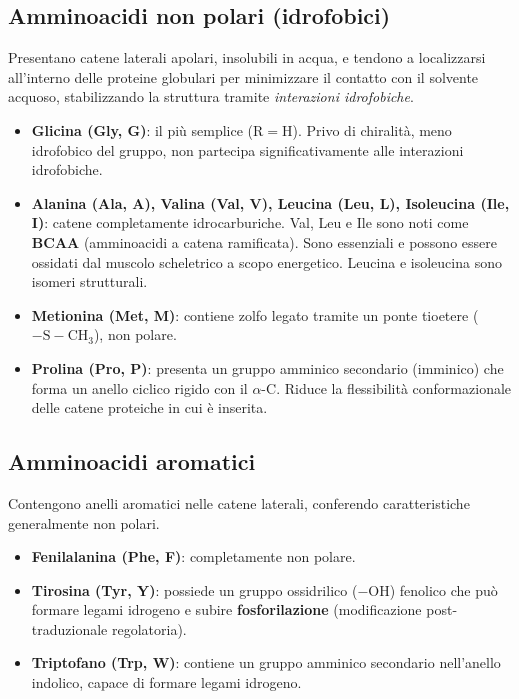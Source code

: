 \documentclass[12pt,a4paper]{report}
\begin{document}
\subsection{Amminoacidi non polari (idrofobici)}
Presentano catene laterali apolari, insolubili in acqua, e tendono a localizzarsi all'interno delle proteine globulari per minimizzare il contatto con il solvente acquoso, stabilizzando la struttura tramite \textit{interazioni idrofobiche}.
\begin{itemize}
\item \textbf{Glicina (Gly, G)}: il più semplice (\(\mathrm{R} = \mathrm{H}\)). Privo di chiralità, meno idrofobico del gruppo, non partecipa significativamente alle interazioni idrofobiche.
\item \textbf{Alanina (Ala, A), Valina (Val, V), Leucina (Leu, L), Isoleucina (Ile, I)}: catene completamente idrocarburiche. Val, Leu e Ile sono noti come \textbf{BCAA} (amminoacidi a catena ramificata). Sono essenziali e possono essere ossidati dal muscolo scheletrico a scopo energetico. Leucina e isoleucina sono isomeri strutturali.
\item \textbf{Metionina (Met, M)}: contiene zolfo legato tramite un ponte tioetere (\(-\mathrm{S-CH_3}\)), non polare.
\item \textbf{Prolina (Pro, P)}: presenta un gruppo amminico secondario (imminico) che forma un anello ciclico rigido con il \(\alpha\)-C. Riduce la flessibilità conformazionale delle catene proteiche in cui è inserita.
\end{itemize}

\subsection{Amminoacidi aromatici}
Contengono anelli aromatici nelle catene laterali, conferendo caratteristiche generalmente non polari.
\begin{itemize}
\item \textbf{Fenilalanina (Phe, F)}: completamente non polare.
\item \textbf{Tirosina (Tyr, Y)}: possiede un gruppo ossidrilico (\(-\mathrm{OH}\)) fenolico che può formare legami idrogeno e subire \textbf{fosforilazione} (modificazione post-traduzionale regolatoria).
\item \textbf{Triptofano (Trp, W)}: contiene un gruppo amminico secondario nell'anello indolico, capace di formare legami idrogeno.
\end{itemize}
\end{document}
